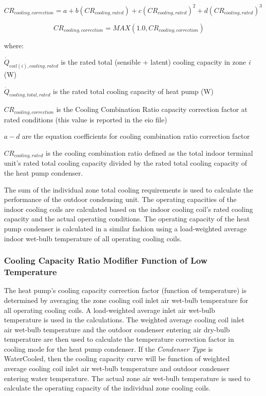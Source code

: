 \begin{equation}
C{R_{cooling,correction}} = a + b\left( {C{R_{cooling,rated}}} \right) + c{\left( {C{R_{cooling,rated}}} \right)^2} + d{\left( {C{R_{cooling,rated}}} \right)^3}
\end{equation}

\begin{equation}
C{R_{cooling,correction}} = MAX\left( {1.0,C{R_{cooling,correction}}} \right)
\end{equation}

where:

\({\dot{Q}_{coil(i),cooling,rated}}\) is the rated total (sensible + latent) cooling capacity in zone \emph{i} (W)

\({\dot{Q}_{cooling,total,rated}}\) is the rated total cooling capacity of heat pump (W)

\(C{R_{cooling,correction}}\) is the Cooling Combination Ratio capacity correction factor at rated conditions (this value is reported in the eio file)

\(a - d\) are the equation coefficients for cooling combination ratio correction factor

\(C{R_{cooling,rated}}\) is the cooling combination ratio defined as the total indoor terminal unit's rated total cooling capacity divided by the rated total cooling capacity of the heat pump condenser.

The sum of the individual zone total cooling requirements is used to calculate the performance of the outdoor condensing unit. The operating capacities of the indoor cooling coils are calculated based on the indoor cooling coil's rated cooling capacity and the actual operating conditions. The operating capacity of the heat pump condenser is calculated in a similar fashion using a load-weighted average indoor wet-bulb temperature of all operating cooling coils.

\subsubsection{Cooling Capacity Ratio Modifier Function of Low Temperature}\label{cooling-capacity-ratio-modifier-function-of-low-temperature}

The heat pump's cooling capacity correction factor (function of temperature) is determined by averaging the zone cooling coil inlet air wet-bulb temperature for all operating cooling coils. A load-weighted average inlet air wet-bulb temperature is used in the calculations. The weighted average cooling coil inlet air wet-bulb temperature and the outdoor condenser entering air dry-bulb temperature are then used to calculate the temperature correction factor in cooling mode for the heat pump condenser. If the \textit{Condenser Type} is WaterCooled, then the cooling capacity curve will be function of weighted average cooling coil inlet air wet-bulb temperature and outdoor condenser entering water temperature. The actual zone air wet-bulb temperature is used to calculate the operating capacity of the individual zone cooling coils.

